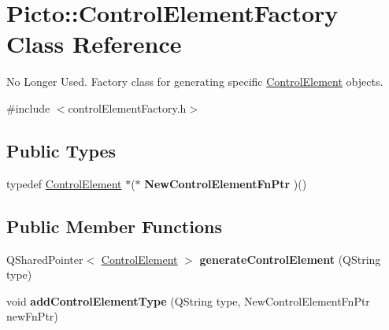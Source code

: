 \hypertarget{class_picto_1_1_control_element_factory}{\section{Picto\-:\-:Control\-Element\-Factory Class Reference}
\label{class_picto_1_1_control_element_factory}
}


No Longer Used. Factory class for generating specific \hyperlink{class_picto_1_1_control_element}{Control\-Element} objects.  




{\ttfamily \#include $<$control\-Element\-Factory.\-h$>$}

\subsection*{Public Types}
\begin{DoxyCompactItemize}
\item 
\hypertarget{class_picto_1_1_control_element_factory_aad8224798d5c2503cd4e2f0223b27ee1}{typedef \hyperlink{class_picto_1_1_control_element}{Control\-Element} $\ast$($\ast$ {\bfseries New\-Control\-Element\-Fn\-Ptr} )()}\label{class_picto_1_1_control_element_factory_aad8224798d5c2503cd4e2f0223b27ee1}

\end{DoxyCompactItemize}
\subsection*{Public Member Functions}
\begin{DoxyCompactItemize}
\item 
\hypertarget{class_picto_1_1_control_element_factory_ae6041412f8a16e79efad795b44182daf}{Q\-Shared\-Pointer$<$ \hyperlink{class_picto_1_1_control_element}{Control\-Element} $>$ {\bfseries generate\-Control\-Element} (Q\-String type)}\label{class_picto_1_1_control_element_factory_ae6041412f8a16e79efad795b44182daf}

\item 
\hypertarget{class_picto_1_1_control_element_factory_af142a636ea444ac65b515d8077e2f628}{void {\bfseries add\-Control\-Element\-Type} (Q\-String type, New\-Control\-Element\-Fn\-Ptr new\-Fn\-Ptr)}\label{class_picto_1_1_control_element_factory_af142a636ea444ac65b515d8077e2f628}

\end{DoxyCompactItemize}


